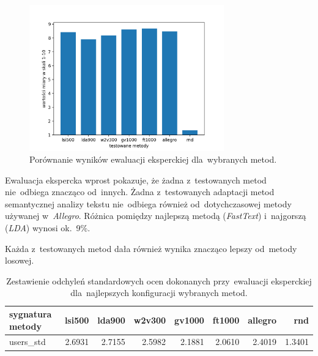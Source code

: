 \documentclass[pl]{minipw} %
\begin{document}
\begin{figure}[H]
	\centering
	\includegraphics[width=0.75\textwidth]{img/results/lsi500_lda900_w2v300_gv1000_ft1000_allegro_rnd_users.png}
	\caption{Porównanie wyników ewaluacji eksperckiej dla~wybranych metod.}
\end{figure}

Ewaluacja ekspercka wprost pokazuje, że żadna z~testowanych metod nie~odbiega znacząco od~innych. Żadna z~testowanych adaptacji metod semantycznej analizy tekstu nie~odbiega również od~dotychczasowej metody używanej w~\textit{Allegro}. Różnica pomiędzy najlepszą metodą (\textit{FastText}) i~najgorszą (\textit{LDA}) wynosi ok.~9\%.

Każda z~testowanych metod dała również wynika znacząco lepszy od~metody losowej.


\begin{table}[H]
	\centering
	\begin{tabular}{lrrrrrrr}
		\hline
		sygnatura metody&   lsi500 &   lda900 &   w2v300 &   gv1000 &   ft1000 &   allegro &     rnd \\
		\hline
		users\_std &   2.6931 &   2.7155 &   2.5982 &   2.1881 &    2.0610 &    2.4019 & 1.3401 \\
		\hline
	\end{tabular}
	\caption{Zestawienie odchyleń standardowych ocen dokonanych przy~ewaluacji eksperckiej dla~najlepszych konfiguracji wybranych metod.}
\end{table}
\end{document}
